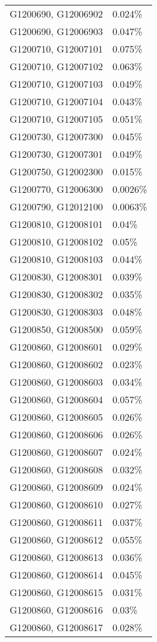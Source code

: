 \begin{longtable}[]{@{}ll@{}}
G1200690, G12006902 & 0.024\% \\
G1200690, G12006903 & 0.047\% \\
G1200710, G12007101 & 0.075\% \\
G1200710, G12007102 & 0.063\% \\
G1200710, G12007103 & 0.049\% \\
G1200710, G12007104 & 0.043\% \\
G1200710, G12007105 & 0.051\% \\
G1200730, G12007300 & 0.045\% \\
G1200730, G12007301 & 0.049\% \\
G1200750, G12002300 & 0.015\% \\
G1200770, G12006300 & 0.0026\% \\
G1200790, G12012100 & 0.0063\% \\
G1200810, G12008101 & 0.04\% \\
G1200810, G12008102 & 0.05\% \\
G1200810, G12008103 & 0.044\% \\
G1200830, G12008301 & 0.039\% \\
G1200830, G12008302 & 0.035\% \\
G1200830, G12008303 & 0.048\% \\
G1200850, G12008500 & 0.059\% \\
G1200860, G12008601 & 0.029\% \\
G1200860, G12008602 & 0.023\% \\
G1200860, G12008603 & 0.034\% \\
G1200860, G12008604 & 0.057\% \\
G1200860, G12008605 & 0.026\% \\
G1200860, G12008606 & 0.026\% \\
G1200860, G12008607 & 0.024\% \\
G1200860, G12008608 & 0.032\% \\
G1200860, G12008609 & 0.024\% \\
G1200860, G12008610 & 0.027\% \\
G1200860, G12008611 & 0.037\% \\
G1200860, G12008612 & 0.055\% \\
G1200860, G12008613 & 0.036\% \\
G1200860, G12008614 & 0.045\% \\
G1200860, G12008615 & 0.031\% \\
G1200860, G12008616 & 0.03\% \\
G1200860, G12008617 & 0.028\% \\

\end{longtable}
